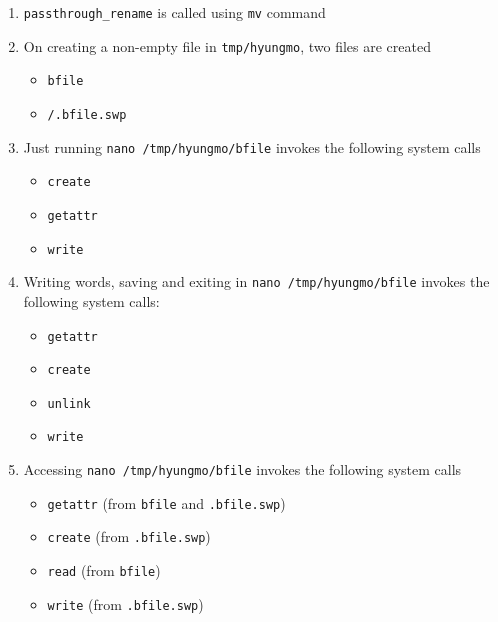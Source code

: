 \documentclass[12pt]{article}
\begin{document}
\begin{enumerate}[1.]
    \item \texttt{passthrough\_rename} is called using \texttt{mv} command
    \item On creating a non-empty file in \texttt{tmp/hyungmo}, two files are created

    \begin{itemize}
        \item \texttt{bfile}
        \item \texttt{/.bfile.swp}
    \end{itemize}


    \item Just running \texttt{nano /tmp/hyungmo/bfile} invokes the following system calls

    \begin{itemize}
        \item \texttt{create}
        \item \texttt{getattr}
        \item \texttt{write}
    \end{itemize}

    \item Writing words, saving and exiting in \texttt{nano /tmp/hyungmo/bfile} invokes the following system calls:

    \begin{itemize}
        \item \texttt{getattr}
        \item \texttt{create}
        \item \texttt{unlink}
        \item \texttt{write}
    \end{itemize}

    \item Accessing \texttt{nano /tmp/hyungmo/bfile} invokes the following system calls

    \begin{itemize}
        \item \texttt{getattr} (from \texttt{bfile} and \texttt{.bfile.swp})
        \item \texttt{create} (from \texttt{.bfile.swp})
        \item \texttt{read} (from \texttt{bfile})
        \item \texttt{write} (from \texttt{.bfile.swp})
    \end{itemize}

\end{enumerate}
\end{document}
